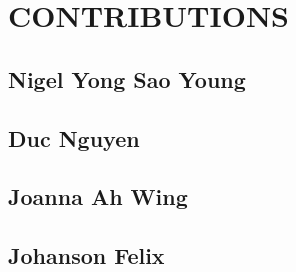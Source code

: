 \newpage
\section{CONTRIBUTIONS}
\subsection{Nigel Yong Sao Young}

\subsection{Duc Nguyen}

\subsection{Joanna Ah Wing}

\subsection{Johanson Felix}
